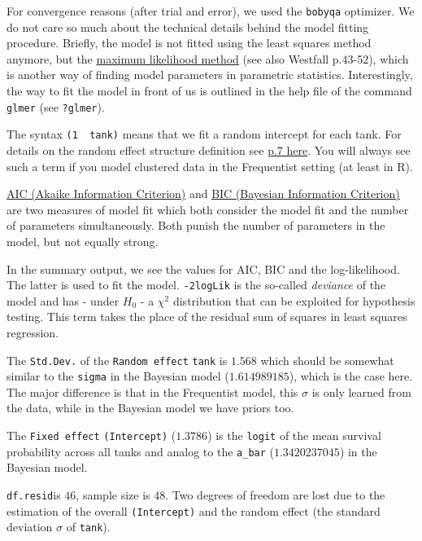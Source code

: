 \documentclass[
]{book}
\begin{document}
For convergence reasons (after trial and error), we used the \texttt{bobyqa} optimizer.
We do not care so much about the technical details behind the model fitting procedure.
Briefly, the model is not fitted using the least squares method anymore,
but the \href{https://www.youtube.com/watch?v=XepXtl9YKwc&ab_channel=StatQuestwithJoshStarmer}{maximum likelihood method}
(see also Westfall p.43-52),
which is another way of finding model parameters in parametric statistics.
Interestingly, the way to fit the model in front of us is outlined in the help file of the command
\texttt{glmer} (see \texttt{?glmer}).

The syntax \texttt{(1\ \textbar{}\ tank)} means that we fit a random intercept for each tank.
For details on the random effect structure definition see
\href{https://cran.r-project.org/web/packages/lme4/vignettes/lmer.pdf}{p.7 here}.
You will always see such a term if you model clustered data in the Frequentist
setting (at least in R).

\href{https://en.wikipedia.org/wiki/Akaike_information_criterion}{AIC (Akaike Information Criterion)}
and \href{https://en.wikipedia.org/wiki/Bayesian_information_criterion}{BIC (Bayesian Information Criterion)}
are two measures of model fit which both consider the model fit and the number
of parameters simultaneously. Both punish the number of parameters in the model,
but not equally strong.

In the summary output, we see the values for AIC, BIC and the log-likelihood.
The latter is used to fit the model. \texttt{-2logLik} is the so-called \emph{deviance} of
the model and has - under \(H_0\) - a \(\chi^2\) distribution that can be exploited
for hypothesis testing. This term takes the place of the residual sum of squares
in least squares regression.

The \texttt{Std.Dev.} of the \texttt{Random\ effect} \texttt{tank} is \(1.568\) which should be somewhat similar
to the \texttt{sigma} in the Bayesian model (\(1.614989185\)), which is the case here.
The major difference is that in the Frequentist model, this \(\sigma\) is only
learned from the data, while in the Bayesian model we have priors too.

The \texttt{Fixed\ effect} \texttt{(Intercept)} (\(1.3786\)) is the \texttt{logit} of the mean survival probability
across all tanks and analog to the \texttt{a\_bar} (\(1.3420237045\)) in the Bayesian model.

\texttt{df.resid}is \(46\), sample size is \(48\). Two degrees of freedom are lost due
to the estimation of the overall \texttt{(Intercept)} and the random effect (the standard
deviation \(\sigma\) of \texttt{tank}).
\end{document}
